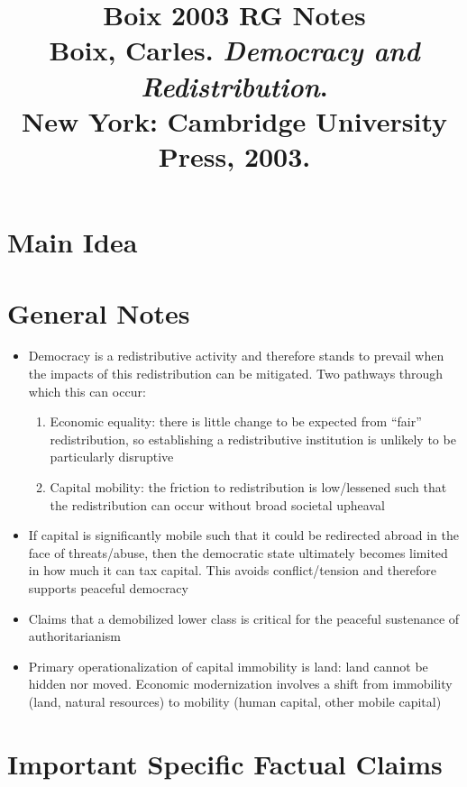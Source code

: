 \documentclass[12pt]{article}
\title{\textbf{Boix 2003 RG Notes}\\
\large Boix, Carles. \textit{Democracy and Redistribution}.\\
New York: Cambridge University Press, 2003.}
\author{}
\date{}
\begin{document}
\maketitle

\section{Main Idea}



\section{General Notes}

\begin{itemize}[leftmargin=*, itemsep=4pt]
    \item Democracy is a redistributive activity and therefore stands to prevail when the impacts of this redistribution can be mitigated. Two pathways through which this can occur:
    \begin{enumerate}
        \item Economic equality: there is little change to be expected from ``fair'' redistribution, so establishing a redistributive institution is unlikely to be particularly disruptive
        \item Capital mobility: the friction to redistribution is low/lessened such that the redistribution can occur without broad societal upheaval
    \end{enumerate}
    \item If capital is significantly mobile such that it could be redirected abroad in the face of threats/abuse, then the democratic state ultimately becomes limited in how much it can tax capital. This avoids conflict/tension and therefore supports peaceful democracy
    \item Claims that a demobilized lower class is critical for the peaceful sustenance of authoritarianism
    \item Primary operationalization of capital immobility is land: land cannot be hidden nor moved. Economic modernization involves a shift from immobility (land, natural resources) to mobility (human capital, other mobile capital)
\end{itemize}


\section{Important Specific Factual Claims}
\end{document}
